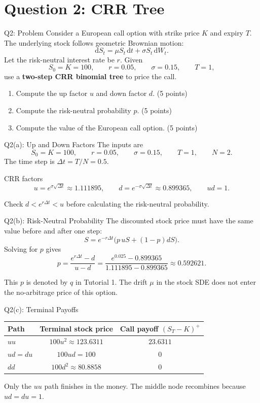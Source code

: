 \documentclass{beamer}
\newcommand{\dd}{\mathrm{d}}
\begin{document}
\section{Question 2: CRR Tree}

\begin{frame}{Q2: Problem}
\small
Consider a European call option with strike price $K$ and expiry $T$.
The underlying stock follows geometric Brownian motion:
\[
\dd S_t=\mu S_t\,\dd t+\sigma S_t\,\dd W_t.
\]
Let the risk-neutral interest rate be $r$. Given
\[
S_0=K=100,\qquad r=0.05,\qquad \sigma=0.15,\qquad T=1,
\]
use a \textbf{two-step CRR binomial tree} to price the call.
\begin{enumerate}
\item[(a)] Compute the up factor $u$ and down factor $d$. \hfill (5 points)
\item[(b)] Compute the risk-neutral probability $p$. \hfill (5 points)
\item[(c)] Compute the value of the European call option. \hfill (5 points)
\end{enumerate}
\end{frame}

\begin{frame}{Q2(a): Up and Down Factors}
The inputs are
\[
S_0=K=100,\qquad r=0.05,\qquad \sigma=0.15,
\qquad T=1,\qquad N=2.
\]
The time step is $\Delta t=T/N=0.5$.

\begin{block}{CRR factors}
\[
u=e^{\sigma\sqrt{\Delta t}}\approx1.111895,
\qquad
d=e^{-\sigma\sqrt{\Delta t}}\approx0.899365,
\qquad ud=1.
\]
\end{block}

Check $d<e^{r\Delta t}<u$ before calculating the
risk-neutral probability.
\end{frame}

\begin{frame}{Q2(b): Risk-Neutral Probability}
The discounted stock price must have the same value before and after
one step:
\[
S=e^{-r\Delta t}\bigl(p\,uS+(1-p)dS\bigr).
\]
Solving for $p$ gives
\[
p=\frac{e^{r\Delta t}-d}{u-d}
=\frac{e^{0.025}-0.899365}{1.111895-0.899365}
\approx \boxed{0.592621}.
\]

This $p$ is denoted by $q$ in Tutorial 1.
The drift $\mu$ in the stock SDE does not enter the
no-arbitrage price of this option.
\end{frame}

\begin{frame}{Q2(c): Terminal Payoffs}
\begin{center}
\begin{tabular}{lcc}
\toprule
Path & Terminal stock price & Call payoff $(S_T-K)^+$\\
\midrule
$uu$ & $100u^2\approx123.6311$ & $23.6311$\\
$ud=du$ & $100ud=100$ & $0$\\
$dd$ & $100d^2\approx80.8858$ & $0$\\
\bottomrule
\end{tabular}
\end{center}
\vspace{0.5cm}
Only the $uu$ path finishes in the money.
The middle node recombines because $ud=du=1$.
\end{frame}
\end{document}
